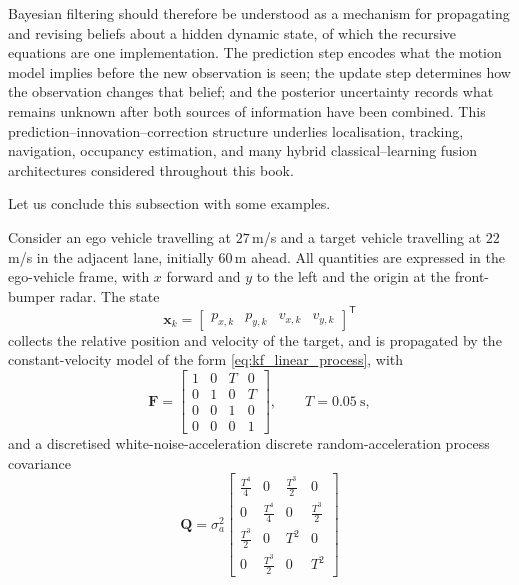 \documentclass[graybox,envcountchap]{style/SNmono}
\providecommand{\DIFadd}[1]{{\protect\color{blue} #1}} %
\providecommand{\DIFdel}[1]{{\protect\color{red} #1}} %
\providecommand{\DIFaddbegin}{} %
\providecommand{\DIFaddend}{} %
\providecommand{\DIFdelbegin}{} %
\providecommand{\DIFdelend}{} %
\begin{document}
Bayesian filtering should therefore be understood as a mechanism for propagating and revising beliefs about a hidden dynamic state, of which the recursive equations are one implementation. The prediction step encodes what the motion model implies before the new observation is seen; the update step determines how the observation changes that belief; and the posterior uncertainty records what remains unknown after both sources of information have been combined. This prediction--innovation--correction structure underlies localisation, tracking, navigation, occupancy estimation, and many hybrid classical--learning fusion architectures considered throughout this book.

Let us conclude this subsection with some examples.


\begin{example}
\label{ex:ekf-radar-cutin}
Consider an ego vehicle travelling at $27$\,m/s and a target vehicle travelling
at $22$\,m/s in the adjacent lane, initially $60$\,m ahead. All quantities are
expressed in the ego-vehicle frame, with $x$ forward and $y$ to the left and the
origin at the front-bumper radar. The state
\begin{equation}
\mathbf{x}_k=
\begin{bmatrix}
p_{x,k} & p_{y,k} & v_{x,k} & v_{y,k}
\end{bmatrix}^{\mathsf T}
\end{equation}
collects the relative position and velocity of the target, and is propagated by
the constant-velocity model of the form
\eqref{eq:kf_linear_process}, with
\begin{equation}
\mathbf{F}=
\begin{bmatrix}
1&0&T&0\\
0&1&0&T\\
0&0&1&0\\
0&0&0&1
\end{bmatrix},
\qquad T=0.05\ \mathrm{s},
\end{equation}
and a \DIFdelbegin \DIFdel{discretised white-noise-acceleration }\DIFdelend \DIFaddbegin \DIFadd{discrete random-acceleration }\DIFaddend process covariance
\begin{equation}
\mathbf{Q}=\sigma_a^{2}
\begin{bmatrix}
\tfrac{T^{4}}{4}&0&\tfrac{T^{3}}{2}&0\\[2pt]
0&\tfrac{T^{4}}{4}&0&\tfrac{T^{3}}{2}\\[2pt]
\tfrac{T^{3}}{2}&0&T^{2}&0\\[2pt]
0&\tfrac{T^{3}}{2}&0&T^{2}

\end{bmatrix}
\end{equation}
\end{example}
\end{document}
